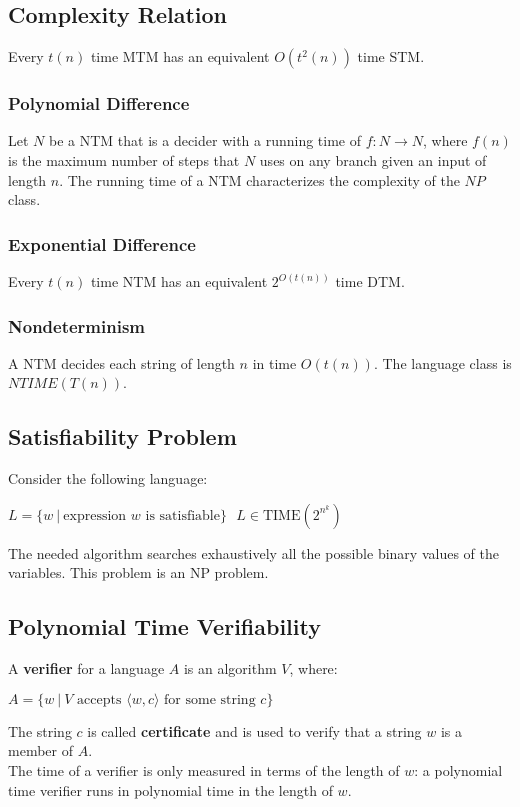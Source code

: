 \documentclass{article}
\begin{document}
\subsection{Complexity Relation}
Every $t(n)$ time MTM has an equivalent $O(t^2(n))$ time STM. \\
\subsubsection{Polynomial Difference}
Let $N$ be a NTM that is a decider with a running time of $f : N \rightarrow N$, where $f(n)$ is the maximum number of steps that $N$ uses on any branch given an input of length $n$.
The running time of a NTM characterizes the complexity of the $NP$ class.
\subsubsection{Exponential Difference}
Every $t(n)$ time NTM has an equivalent $2^{O(t(n))}$ time DTM.
\subsubsection{Nondeterminism}
A NTM decides each string of length $n$ in time $O(t(n))$. The language class is $NTIME(T(n))$. 
\subsection{Satisfiability Problem}
Consider the following language:
\begin{center}
    $L = \{w \ | \ \text{expression }w\text{ is satisfiable}\} \ \ \ L\in \text{TIME}(2^{n^k})$
\end{center}
The needed algorithm searches exhaustively all the possible binary values of the variables. This problem is an NP problem.
\subsection{Polynomial Time Verifiability}
A \textbf{verifier} for a language $A$ is an algorithm $V$, where:
\begin{center}
    $A = \{w \ | \ V \text{ accepts } \langle w,c\rangle \text{ for some string } c\}$
\end{center}
The string $c$ is called \textbf{certificate} and is used to verify that a string $w$ is a member of $A$. \\
The time of a verifier is only measured in terms of the length of $w$: a polynomial time verifier runs in polynomial time in the length of $w$.
\end{document}
